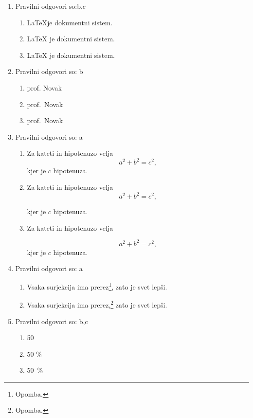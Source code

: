 \documentclass[11pt]{article}
\begin{document}
\begin{enumerate}
    \item Pravilni odgovori so:b,c %
    \begin{enumerate}
        \item \LaTeX je dokumentni sistem.
        \item {\LaTeX} je dokumentni sistem.
        \item \LaTeX{} je dokumentni sistem.
    \end{enumerate}

    \item Pravilni odgovori so: b%
    \begin{enumerate}
        \item prof. Novak
        \item prof.~Novak
        \item prof.\ Novak
    \end{enumerate}

    \item Pravilni odgovori so: a%
    \begin{enumerate}
        \item
Za kateti in hipotenuzo velja
\[
  a^2 + b^2 = c^2,
\]
kjer je \(c\) hipotenuza.
        \item
Za kateti in hipotenuzo velja
\[
  a^2 + b^2 = c^2,
\]

kjer je \(c\) hipotenuza.
        \item
Za kateti in hipotenuzo velja

\[
  a^2 + b^2 = c^2,
\]
kjer je \(c\) hipotenuza.
    \end{enumerate}

    \item Pravilni odgovori so: a %
    \begin{enumerate}
        \item Vsaka surjekcija ima prerez\footnote{Opomba.}, zato je svet lepši.
        \item Vsaka surjekcija ima prerez,\footnote{Opomba.} zato je svet lepši.
    \end{enumerate}

    \item Pravilni odgovori so: b,c%
    \begin{enumerate}
        \item 50 %
        \item 50 \%
        \item 50~\%
    \end{enumerate}


\end{enumerate}
\end{document}
